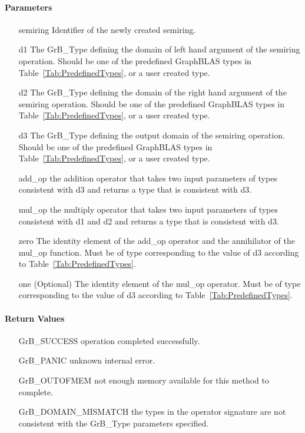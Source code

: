 \paragraph{Parameters}

\begin{itemize}[leftmargin=1.1in]
    \item[{\sf semiring}]       Identifier of the newly created semiring.
    \item[{\sf d1}]     The {\sf GrB\_Type} defining the domain of left hand argument of
    the semiring operation. Should be one of the predefined
    GraphBLAS types in Table~\ref{Tab:PredefinedTypes}, or a user created type.
    \item[{\sf d2}]     The {\sf GrB\_Type} defining the domain of the right hand 
    argument of the semiring operation. Should be one of the predefined
    GraphBLAS types in Table~\ref{Tab:PredefinedTypes}, or a user created type.
    \item[{\sf d3}]      The {\sf GrB\_Type} defining the output domain of the semiring
    operation. Should be one of the predefined
    GraphBLAS types in Table~\ref{Tab:PredefinedTypes}, or a user created type.
    \item[{\sf add\_op}]        the addition operator that takes two input parameters
    of types consistent with {\sf d3} and returns a type that is consistent with {\sf d3}.
    \item[{\sf mul\_op}]        the multiply operator that takes two input parameters
    of types consistent with {\sf d1} and {\sf d2} and returns a type that is consistent with {\sf d3}.
    \item[{\sf zero}]           The identity element of the {\sf add\_op} operator and the
    annihilator of the {\sf mul\_op} function.   Must be of type corresponding to the
    value of {\sf d3} according to Table~\ref{Tab:PredefinedTypes}.
    \item[{\sf one}]            (Optional) The identity element of the {\sf mul\_op} operator. 
    Must be of type corresponding to the value of {\sf d3} according to
    Table~\ref{Tab:PredefinedTypes}.
\end{itemize}


\paragraph{Return Values}

\begin{itemize}[leftmargin=2.1in]
\item[{\sf GrB\_SUCCESS}]           operation completed successfully.
\item[{\sf GrB\_PANIC}]             unknown internal error.
\item[{\sf GrB\_OUTOFMEM}]          not enough memory available for this method to complete.
\item[{\sf GrB\_DOMAIN\_MISMATCH}]  the types in the operator signature are not   
                                    consistent with the {\sf GrB\_Type} parameters specified.
\end{itemize}

